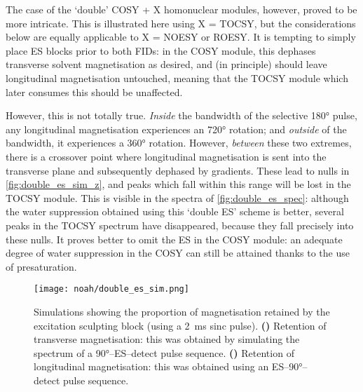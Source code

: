 The case of the `double' COSY + X homonuclear modules, however, proved to be more intricate.
This is illustrated here using X = TOCSY, but the considerations below are equally applicable to X = NOESY or ROESY.
It is tempting to simply place ES blocks prior to both FIDs: in the COSY module, this dephases transverse solvent magnetisation as desired, and (in principle) should leave longitudinal magnetisation untouched, meaning that the TOCSY module which later consumes this should be unaffected.

However, this is not totally true.
\textit{Inside} the bandwidth of the selective \ang{180} pulse, any longitudinal magnetisation experiences an \ang{720} rotation; and \textit{outside} of the bandwidth, it experiences a \ang{360} rotation.
However, \textit{between} these two extremes, there is a crossover point where longitudinal magnetisation is sent into the transverse plane and subsequently dephased by gradients.
These lead to nulls in \cref{fig:double_es_sim_z}, and peaks which fall within this range will be lost in the TOCSY module.
This is visible in the spectra of \cref{fig:double_es_spec}: although the water suppression obtained using this `double ES' scheme is better, several peaks in the TOCSY spectrum have disappeared, because they fall precisely into these nulls.
It proves better to omit the ES in the COSY module: an adequate degree of water suppression in the COSY can still be attained thanks to the use of presaturation.

\begin{figure}[htb]
    \centering
    \texttt{[image: noah/double\_es\_sim.png]}%
    {\label{fig:double_es_sim_xy}}%
    {\label{fig:double_es_sim_z}}%
    \caption[Simulation of magnetisation retained by excitation sculpting block]{
        Simulations showing the proportion of magnetisation retained by the excitation sculpting block (using a \qty{2}{\ms} sinc pulse).
        \textbf{()} Retention of transverse magnetisation: this was obtained by simulating the spectrum of a \ang{90}--ES--detect pulse sequence.
        \textbf{()} Retention of longitudinal magnetisation: this was obtained using an ES--\ang{90}--detect pulse sequence.
    }
    \label{fig:double_es_sim}
\end{figure}


